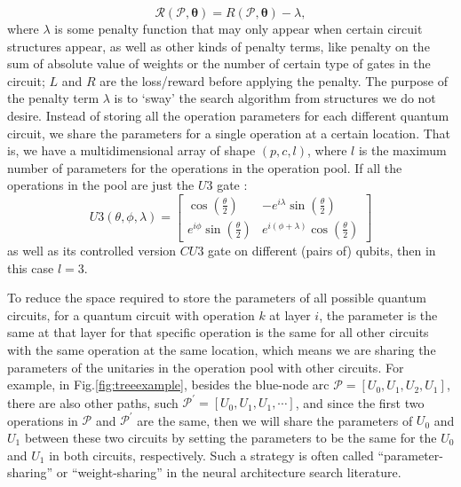 \documentclass{ieeeaccess}
\begin{document}
  \begin{equation}
      \mathcal{R}(\mathcal{P},\boldsymbol{\theta})=R(\mathcal{P}, \boldsymbol{\theta})-\lambda,
  \end{equation}
  where $\lambda$ is some penalty function that may only appear when certain circuit structures appear, as well as other kinds of penalty terms, like penalty on the sum of absolute value of weights or the number of certain type of gates in the circuit; $L$ and $R$ are the loss/reward before applying the penalty. The purpose of the penalty term $\lambda$ is to `sway' the search algorithm from structures we do not desire.
  Instead of storing all the operation parameters for each different quantum circuit, we share the parameters for a single operation at a certain location. That is, we have a multidimensional array of shape $(p, c, l)$, where $l$ is the maximum number of parameters for the operations in the operation pool. If all the operations in the pool are just the $U3$ gate \cite{nielsen00}:
  \begin{equation}
  U 3(\theta, \phi, \lambda)=\left[\begin{array}{cc}
  \cos \left(\frac{\theta}{2}\right) & -e^{i \lambda} \sin \left(\frac{\theta}{2}\right) \\
  e^{i \phi} \sin \left(\frac{\theta}{2}\right) & e^{i(\phi+\lambda)} \cos \left(\frac{\theta}{2}\right)
  \end{array}\right]
  \end{equation}
  as well as its controlled version $CU3$ gate on different (pairs of) qubits, then in this case $l=3$.
  
  To reduce the space required to store the parameters of all possible quantum circuits, for a quantum circuit with operation $k$ at layer $i$, the parameter is the same at that layer for that specific operation is the same for all other circuits with the same operation at the same location, which means we are sharing the parameters of the unitaries in the operation pool with other circuits. For example, in Fig.\ref{fig:treeexample}, besides the blue-node arc $\mathcal{P}=[U_0, U_1, U_2, U_1]$, there are also other paths, such $\mathcal{P}^{'} = [U_0, U_1, U_1, \cdots]$, and since the first two operations in $\mathcal{P}$ and $\mathcal{P}^{'}$ are the same, then we will share the parameters of $U_0$ and $U_1$ between these two circuits by setting the parameters to be the same for the $U_0$ and $U_1$ in both circuits, respectively.
  Such a strategy is often called ``parameter-sharing'' or ``weight-sharing'' in the neural architecture search literature.
  
\end{document}
